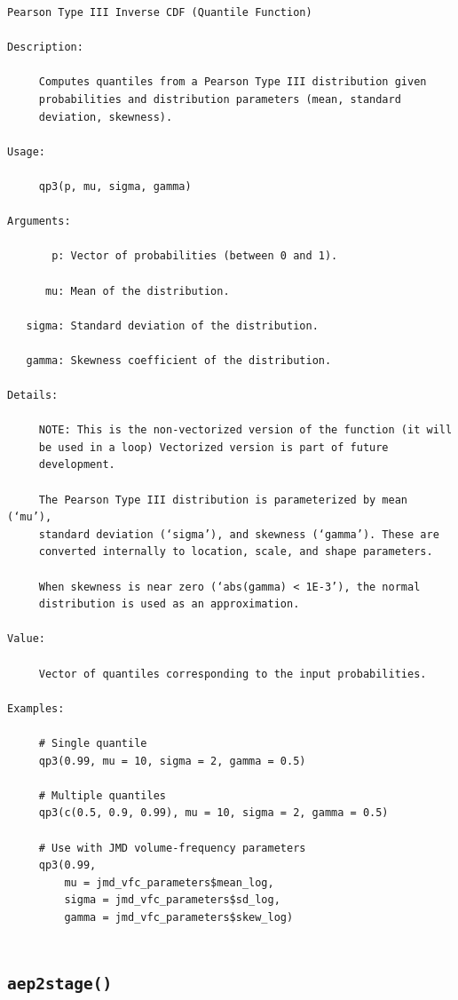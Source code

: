 \documentclass[
  letterpaper,
  DIV=11,
  numbers=noendperiod]{scrreprt}
\begin{document}
\begin{verbatim}
Pearson Type III Inverse CDF (Quantile Function)

Description:

     Computes quantiles from a Pearson Type III distribution given
     probabilities and distribution parameters (mean, standard
     deviation, skewness).

Usage:

     qp3(p, mu, sigma, gamma)
     
Arguments:

       p: Vector of probabilities (between 0 and 1).

      mu: Mean of the distribution.

   sigma: Standard deviation of the distribution.

   gamma: Skewness coefficient of the distribution.

Details:

     NOTE: This is the non-vectorized version of the function (it will
     be used in a loop) Vectorized version is part of future
     development.

     The Pearson Type III distribution is parameterized by mean (‘mu’),
     standard deviation (‘sigma’), and skewness (‘gamma’). These are
     converted internally to location, scale, and shape parameters.

     When skewness is near zero (‘abs(gamma) < 1E-3’), the normal
     distribution is used as an approximation.

Value:

     Vector of quantiles corresponding to the input probabilities.

Examples:

     # Single quantile
     qp3(0.99, mu = 10, sigma = 2, gamma = 0.5)
     
     # Multiple quantiles
     qp3(c(0.5, 0.9, 0.99), mu = 10, sigma = 2, gamma = 0.5)
     
     # Use with JMD volume-frequency parameters
     qp3(0.99,
         mu = jmd_vfc_parameters$mean_log,
         sigma = jmd_vfc_parameters$sd_log,
         gamma = jmd_vfc_parameters$skew_log)
     
\end{verbatim}

\subsection{\texorpdfstring{\texttt{aep2stage()}}{aep2stage()}}\label{aep2stage}
\end{document}

